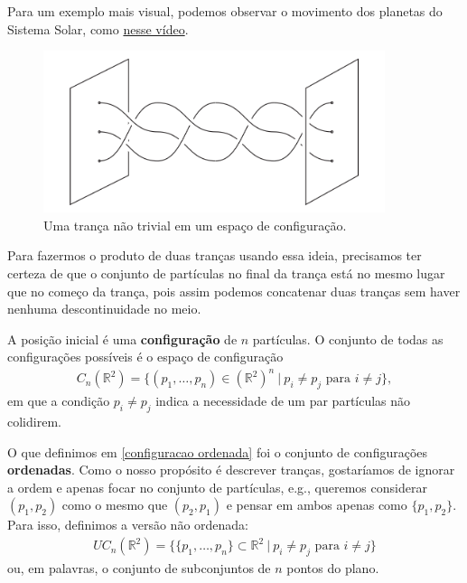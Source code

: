 	\par\vspace{0.3cm} Para um exemplo mais visual, podemos observar o movimento dos planetas 
	do Sistema Solar, como 
	\href{https://www.youtube.com/watch?v=0jHsq36_NTU&list=WL&index=2&t=50s}{nesse vídeo}. 
	\begin{figure}[H]
		\begin{center}
			\includegraphics[width=10cm]{Images/tranca_conf.png}
		\end{center}\caption{Uma trança não trivial em um espaço de configuração.}\label{tranca espaco configuracao}
	\end{figure} 
	Para fazermos o produto de duas tranças usando essa ideia, precisamos ter certeza de que 
	o conjunto de partículas no final da trança está no mesmo lugar que no começo da trança, 
	pois assim podemos concatenar duas tranças sem haver nenhuma descontinuidade no meio.
	
	\par\vspace{0.3cm} A posição inicial é uma \textbf{configuração} de $n$ partículas. 
	O conjunto de todas as configurações possíveis é o espaço de configuração
	\begin{align}
	\label{configuracao ordenada}
	    C_n(\mathbb{R}^2) 
	    = \{ (p_1, \dots, p_n)\in (\mathbb{R}^2)^n \ | \ p_i\neq p_j \text{ para }i\neq j \},
	\end{align}
	em que a condição $p_i\neq p_j$ indica a necessidade de um par partículas não colidirem.
	
	\par\vspace{0.3cm} O que definimos em \eqref{configuracao ordenada} foi o conjunto de 
	configurações \textbf{ordenadas}. Como o nosso propósito é descrever tranças, gostaríamos 
	de ignorar a ordem e apenas focar no conjunto de partículas, e.g., queremos considerar $(p_1, p_2)$ 
	como o mesmo que $(p_2, p_1)$ e pensar em ambos apenas como $\{p_1, p_2\}$. Para isso, 
	definimos a versão não ordenada:
	\begin{align}
	\label{configuracao nao ordenada}
	    UC_n(\mathbb{R}^2) 
	    = \{ \{ p_1, \dots, p_n\}\subset\mathbb{R}^2 \ | \ p_i\neq p_j \text{ para }i\neq j \}
	\end{align} 
	ou, em palavras, o conjunto de subconjuntos de $n$ pontos do plano. 
	
